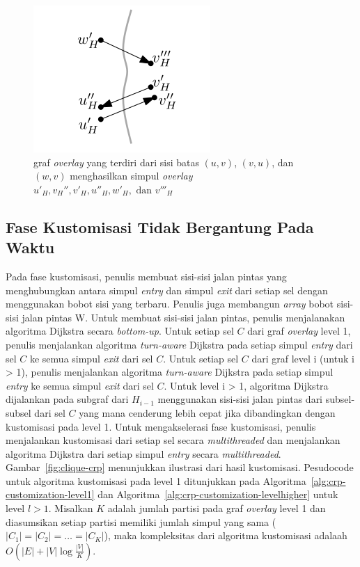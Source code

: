 \begin{figure}[H]
    \centering
    \includegraphics[]{figures/overlay_crp.png}
    \caption{graf \textit{overlay} yang terdiri dari sisi batas $(u,v)$, $(v,u)$, dan $(w,v)$ menghasilkan simpul \textit{overlay} $u'_{H},v_H'',v'_H,u''_H,w'_H, \text{ dan }v'''_H$ }
    \label{fig:crp-overlay2}
\end{figure}




\subsection{Fase Kustomisasi Tidak Bergantung Pada Waktu}
\label{subsec:tdcrp-kustomisasi}
Pada fase kustomisasi, penulis membuat sisi-sisi jalan pintas yang menghubungkan antara simpul \textit{entry} dan simpul \textit{exit} dari setiap sel dengan menggunakan bobot sisi yang terbaru. Penulis juga membangun \textit{array} bobot sisi-sisi jalan pintas W. Untuk membuat sisi-sisi jalan pintas, penulis menjalanakan algoritma Dijkstra secara \textit{bottom-up}. Untuk setiap sel $C$ dari graf \textit{overlay} level 1, penulis menjalankan algoritma \textit{turn-aware} Dijkstra pada setiap simpul \textit{entry} dari sel $C$ ke semua simpul \textit{exit} dari sel $C$. Untuk setiap sel $C$ dari graf level i (untuk i > 1), penulis menjalankan algoritma \textit{turn-aware} Dijkstra pada setiap simpul \textit{entry} ke semua simpul \textit{exit} dari sel $C$. Untuk level i > 1, algoritma Dijkstra dijalankan pada subgraf dari $H_{i-1}$ menggunakan sisi-sisi jalan pintas dari subsel-subsel dari sel $C$ yang mana cenderung lebih cepat jika dibandingkan dengan kustomisasi pada level 1. Untuk mengakselerasi fase kustomisasi, penulis menjalankan kustomisasi dari setiap sel secara \textit{multithreaded} dan menjalankan algoritma Dijkstra dari setiap simpul \textit{entry} secara \textit{multithreaded}. Gambar~\ref{fig:clique-crp} menunjukkan ilustrasi dari hasil kustomisasi. Pesudocode untuk algoritma kustomisasi pada level 1 ditunjukkan pada Algoritma~\ref{alg:crp-customization-level1} dan Algoritma~\ref{alg:crp-customization-levelhigher} untuk level $l>1$. Misalkan $K$ adalah jumlah partisi pada graf \textit{overlay} level 1 dan diasumsikan setiap partisi memiliki jumlah simpul yang sama ($|C_1|=|C_2|=\ldots =|C_K|$), maka kompleksitas dari algoritma kustomisasi adalaah $O(|E|+|V|\log \frac{|V|}{K})$.

